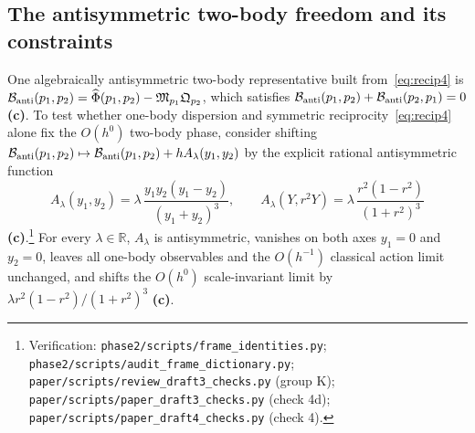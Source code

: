 \documentclass[11pt,a4paper]{article}
\newcommand{\lab}[1]{{\normalfont\sffamily\footnotesize\bfseries(#1)}}
\newcommand{\Lc}{\lab{c}}
\newcommand{\scr}[1]{\nolinkurl{#1}}
\newcommand{\chk}[1]{\footnote{\raggedright Verification: #1.}}
\theoremstyle{remark}
\begin{document}
\subsection{The antisymmetric two-body freedom and its constraints}\label{sec:antisym}

One algebraically antisymmetric two-body representative built from~\eqref{eq:recip4} is $\mathcal B_{\rm anti}(p_1,p_2)=\widehat\Phi(p_1,p_2)-\mathfrak M_{p_1}\mathfrak Q_{p_2}$, which satisfies $\mathcal B_{\rm anti}(p_1,p_2)+\mathcal B_{\rm anti}(p_2,p_1)=0$ \Lc. To test whether one-body dispersion and symmetric reciprocity~\eqref{eq:recip4} alone fix the $O(h^0)$ two-body phase, consider shifting $\mathcal B_{\rm anti}(p_1,p_2)\mapsto\mathcal B_{\rm anti}(p_1,p_2)+hA_\lambda(y_1,y_2)$ by the explicit rational antisymmetric function
\begin{equation}\label{eq:Alambda}
A_\lambda(y_1,y_2)=\lambda\,\frac{y_1y_2(y_1-y_2)}{(y_1+y_2)^3},\qquad
A_\lambda(Y,r^2Y)=\lambda\,\frac{r^2(1-r^2)}{(1+r^2)^3}
\end{equation}
\Lc.\chk{\scr{phase2/scripts/frame_identities.py}; \scr{phase2/scripts/audit_frame_dictionary.py}; \scr{paper/scripts/review_draft3_checks.py} (group K); \scr{paper/scripts/paper_draft3_checks.py} (check 4d); \scr{paper/scripts/paper_draft4_checks.py} (check 4)}
For every $\lambda\in\mathbb R$, $A_\lambda$ is antisymmetric, vanishes on both axes $y_1=0$ and $y_2=0$, leaves all one-body observables and the $O(h^{-1})$ classical action limit unchanged, and shifts the $O(h^0)$ scale-invariant limit by $\lambda r^2(1-r^2)/(1+r^2)^3$ \Lc.
\end{document}
